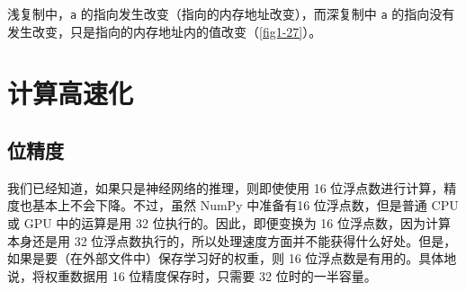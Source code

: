 
浅复制中，\verb|a| 的指向发生改变（指向的内存地址改变），而深复制中 \verb|a| 的指向没有发生改变，只是指向的内存地址内的值改变（\autoref{fig1-27}）。

\section{计算高速化}
\subsection{位精度}
我们已经知道，如果只是神经网络的推理，则即使使用 16 位浮点数进行计算，精度也基本上不会下降。不过，虽然 NumPy 中准备有16 位浮点数，但是普通 CPU 或 GPU 中的运算是用 32 位执行的。因此，即便变换为 16 位浮点数，因为计算本身还是用 32 位浮点数执行的，所以处理速度方面并不能获得什么好处。但是，如果是要（在外部文件中）保存学习好的权重，则 16 位浮点数是有用的。具体地说，将权重数据用 16 位精度保存时，只需要 32 位时的一半容量。